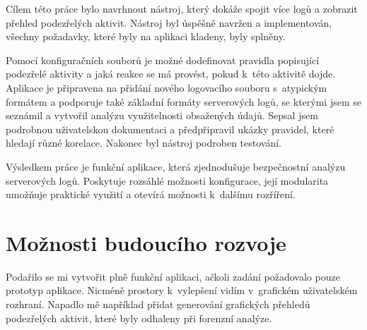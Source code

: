 \documentclass[thesis=B,czech]{FITthesis}[2012/06/26]
\begin{document}
\begin{conclusion}

Cílem této práce bylo navrhnout nástroj, který dokáže spojit více logů a zobrazit přehled podezřelých aktivit. Nástroj byl úspěšně navržen a implementován, všechny požadavky, které byly na aplikaci kladeny, byly splněny. 

Pomocí konfiguračních souborů je možné dodefinovat pravidla popisující podezřelé aktivity a jaká reakce se má provést, pokud k~této aktivitě dojde. Aplikace je připravena na přidání nového logovacího souboru s~atypickým formátem a podporuje také základní formáty serverových logů, se kterými jsem se seznámil a vytvořil analýzu využitelnosti obsažených údajů.
Sepsal jsem podrobnou uživatelskou dokumentaci a předpřipravil ukázky pravidel, které hledají různé korelace. Nakonec byl nástroj podroben testování.

Výsledkem práce je funkční aplikace, která zjednodušuje bezpečnostní analýzu serverových logů. Poskytuje rozsáhlé možnosti konfigurace, její modularita umožňuje praktické využití a otevírá možnosti k~dalšímu rozříření.

\section{Možnosti budoucího rozvoje}
Podařilo se mi vytvořit plně funkční aplikaci, ačkoli zadání požadovalo pouze prototyp aplikace. Nicméně prostory k~vylepšení vidím v~grafickém uživatelském rozhraní. Napadlo mě například přidat generování grafických přehledů podezřelých aktivit, které byly odhaleny při forenzní analýze.

\end{conclusion}
\end{document}
